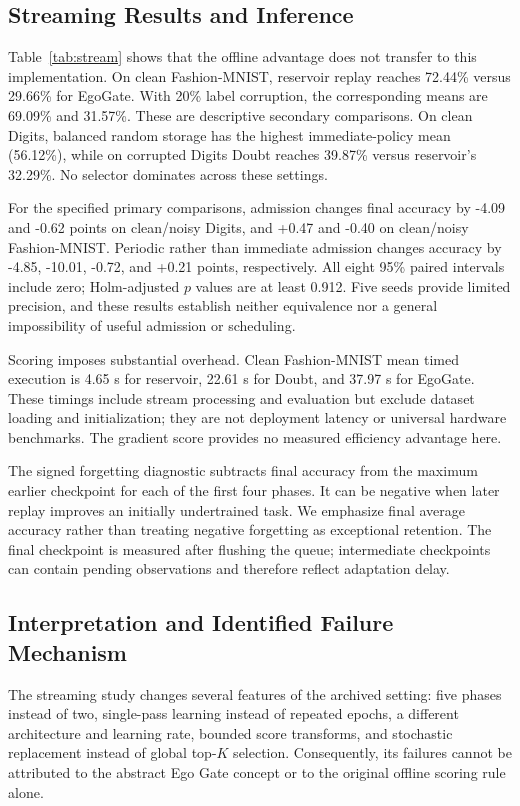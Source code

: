 \documentclass[conference]{IEEEtran}
\begin{document}
\subsection{Streaming Results and Inference}
Table~\ref{tab:stream} shows that the offline advantage does not transfer to this implementation. On clean Fashion-MNIST, reservoir replay reaches 72.44\% versus 29.66\% for EgoGate. With 20\% label corruption, the corresponding means are 69.09\% and 31.57\%. These are descriptive secondary comparisons. On clean Digits, balanced random storage has the highest immediate-policy mean (56.12\%), while on corrupted Digits Doubt reaches 39.87\% versus reservoir's 32.29\%. No selector dominates across these settings.

For the specified primary comparisons, admission changes final accuracy by -4.09 and -0.62 points on clean/noisy Digits, and +0.47 and -0.40 on clean/noisy Fashion-MNIST. Periodic rather than immediate admission changes accuracy by -4.85, -10.01, -0.72, and +0.21 points, respectively. All eight 95\% paired intervals include zero; Holm-adjusted $p$ values are at least 0.912. Five seeds provide limited precision, and these results establish neither equivalence nor a general impossibility of useful admission or scheduling.

Scoring imposes substantial overhead. Clean Fashion-MNIST mean timed execution is 4.65 s for reservoir, 22.61 s for Doubt, and 37.97 s for EgoGate. These timings include stream processing and evaluation but exclude dataset loading and initialization; they are not deployment latency or universal hardware benchmarks. The gradient score provides no measured efficiency advantage here.

The signed forgetting diagnostic subtracts final accuracy from the maximum earlier checkpoint for each of the first four phases. It can be negative when later replay improves an initially undertrained task. We emphasize final average accuracy rather than treating negative forgetting as exceptional retention. The final checkpoint is measured after flushing the queue; intermediate checkpoints can contain pending observations and therefore reflect adaptation delay.

\subsection{Interpretation and Identified Failure Mechanism}
The streaming study changes several features of the archived setting: five phases instead of two, single-pass learning instead of repeated epochs, a different architecture and learning rate, bounded score transforms, and stochastic replacement instead of global top-$K$ selection. Consequently, its failures cannot be attributed to the abstract Ego Gate concept or to the original offline scoring rule alone.
\end{document}
